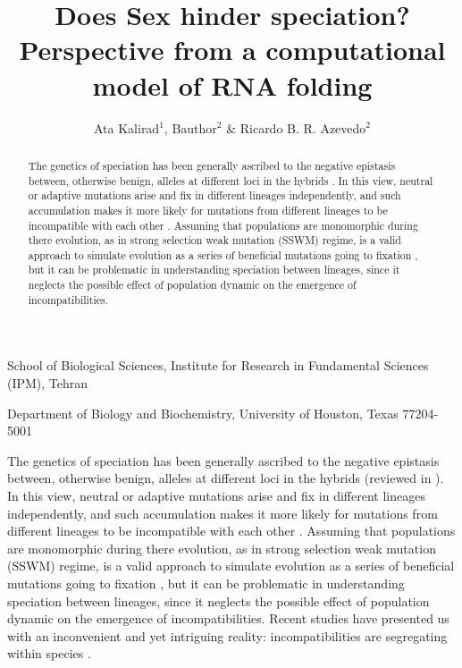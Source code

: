 \documentclass{nature}
\title{Does Sex hinder speciation? Perspective from a computational model of RNA folding}
\author{Ata Kalirad$^{1}$, Bauthor$^2$ \& Ricardo B. R. Azevedo$^2$}
\begin{document}
\maketitle

\begin{affiliations}
 \item School of Biological Sciences, Institute for Research in Fundamental Sciences (IPM), Tehran
 \item Department of Biology and Biochemistry, University of Houston, Texas 77204-5001
 \end{affiliations}

\begin{abstract}
The genetics of speciation has been generally ascribed to the negative epistasis between, otherwise benign, alleles at different loci in the hybrids \cite{Maheshwari2011}. In this view, neutral or adaptive mutations arise and fix in different lineages independently, and such accumulation makes it more likely for mutations from different lineages to be incompatible with each other \cite{Orr1995}. Assuming that populations are monomorphic during there evolution, as in strong selection weak mutation (SSWM) regime,  is a valid approach to simulate evolution as a series of beneficial mutations going to fixation \cite{Sniegowski2010}, but it can be problematic in understanding speciation between lineages, since it neglects the possible effect of population dynamic on the emergence of incompatibilities.
\end{abstract}

The genetics of speciation has been generally ascribed to the negative epistasis between, otherwise benign, alleles at different loci in the hybrids (reviewed in \cite{Maheshwari2011}). In this view, neutral or adaptive mutations arise and fix in different lineages independently, and such accumulation makes it more likely for mutations from different lineages to be incompatible with each other \cite{Orr1995}. Assuming that populations are monomorphic during there evolution, as in strong selection weak mutation (SSWM) regime,  is a valid approach to simulate evolution as a series of beneficial mutations going to fixation \cite{Sniegowski2010}, but it can be problematic in understanding speciation between lineages, since it neglects the possible effect of population dynamic on the emergence of incompatibilities. Recent studies have presented us with an inconvenient and yet intriguing reality: incompatibilities are segregating within species \cite{Seidel2008, Corbett-Detig2013, Hou2014, Chae2014}. 
\end{document}
